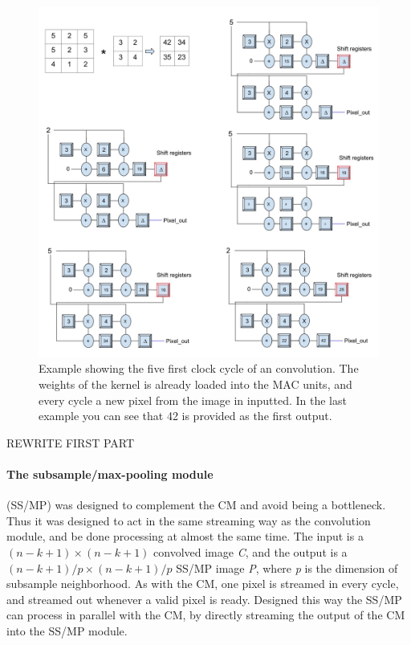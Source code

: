 \begin{figure}[h!]
  \centering
      \includegraphics[width=1.0\textwidth]{Figures/Method/Conv_example}
  \caption{Example showing the five first clock cycle of an convolution. The weights of the kernel is already loaded into the MAC units, and every cycle a new pixel from the image in inputted. In the last example you can see that 42 is provided as the first output.}
\end{figure}

\vspace*{1\baselineskip}
REWRITE FIRST PART
\paragraph{The subsample/max-pooling module} (SS/MP) was designed to complement the CM and avoid being a bottleneck. Thus it was designed to act in the same streaming way as the convolution module, and be done processing at almost the same time. The input is a $ (n-k+1) \times (n-k+1) $ convolved image \textit{C}, and the output is a $ (n-k+1)/p \times (n-k+1)/p $ SS/MP image \textit{P}, where \textit{p} is the dimension of subsample neighborhood. As with the CM, one pixel is streamed in every cycle, and streamed out whenever a valid pixel is ready. Designed this way the SS/MP can process in parallel with the CM, by directly streaming the output of the CM into the SS/MP module. 

